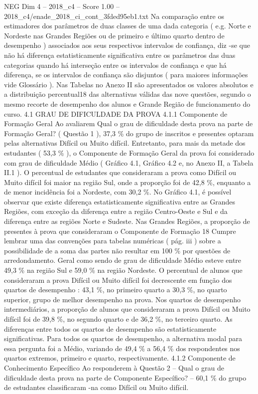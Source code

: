 \begin{textsample}{NEG Dim 4 – 2018\_c4 – Score 1.00 – 2018\_c4/enade\_2018\_ci\_cont\_3fded95eb1.txt}
Na comparação entre os estimadores dos parâmetros de duas classes de uma dada categoria ( e.g.
Norte e Nordeste nas Grandes Regiões ou de primeiro e último quarto dentro de desempenho ) associados aos seus respectivos intervalos de confiança, diz -se que não há diferença estatisticamente significativa entre os parâmetros das duas categorias quando há interseção entre os intervalos de confiança e que há diferença, se os intervalos de confiança são disjuntos ( para maiores informações vide Glossário ).
Nas Tabelas no Anexo II são apresentados os valores absolutos e a distribuição percentual18 das alternativas válidas das nove questões, segundo o mesmo recorte de desempenho dos alunos e Grande Região de funcionamento do curso. 4.1 GRAU DE DIFICULDADE DA PROVA 4.1.1 Componente de Formação Geral Ao avaliarem Qual o grau de dificuldade desta prova na parte de Formação Geral? ( Questão 1 ), 37,3 \% do grupo de inscritos e presentes optaram pelas alternativas Difícil ou Muito difícil.
Entretanto, para mais da metade dos estudantes ( 53,3 \% ), o Componente de Formação Geral da prova foi considerado com grau de dificuldade Médio ( Gráfico 4.1, Gráfico 4.2 e, no Anexo II, a Tabela II.1 ).
O percentual de estudantes que consideraram a prova como Difícil ou Muito difícil foi maior na região Sul, onde a proporção foi de 42,8 \%, enquanto a de menor incidência foi a Nordeste, com 30,2 \%.
No Gráfico 4.1, é possível observar que existe diferença estatisticamente significativa entre as Grandes Regiões, com exceção da diferença entre a região Centro-Oeste e Sul e da diferença entre as regiões Norte e Sudeste.
Nas Grandes Regiões, a proporção de presentes à prova que consideraram o Componente de Formação 18 Cumpre lembrar uma das convenções para tabelas numéricas ( pág. iii ) sobre a possibilidade de a soma das partes não resultar em 100 \% por questões de arredondamento.
Geral como sendo de grau de dificuldade Médio esteve entre 49,3 \% na região Sul e 59,0 \% na região Nordeste.
O percentual de alunos que consideraram a prova Difícil ou Muito difícil foi decrescente em função dos quartos de desempenho : 43,1 \%, no primeiro quarto a 30,3 \%, no quarto superior, grupo de melhor desempenho na prova.
Nos quartos de desempenho intermediários, a proporção de alunos que consideraram a prova Difícil ou Muito difícil foi de 39,8 \%, no segundo quarto e de 36,2 \%, no terceiro quarto.
As diferenças entre todos os quartos de desempenho são estatisticamente significativas.
Para todos os quartos de desempenho, a alternativa modal para essa pergunta foi a Médio, variando de 49,4 \% a 56,4 \% dos respondentes nos quartos extremos, primeiro e quarto, respectivamente. 4.1.2 Componente de Conhecimento Específico Ao responderem à Questão 2 – Qual o grau de dificuldade desta prova na parte de Componente Específico? – 60,1 \% do grupo de estudantes classificaram -na como Difícil ou Muito difícil.

\end{textsample}
